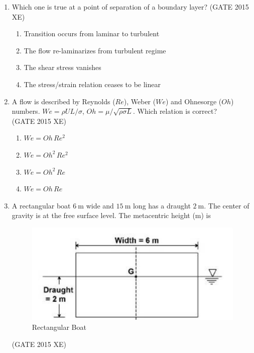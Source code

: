 \documentclass[journal,12pt,onecolumn]{IEEEtran}
\begin{document}
\begin{enumerate}
\item Which one is true at a point of separation of a boundary layer?  
\hfill{(GATE 2015 XE)} \\
\begin{multicols}{2}
\begin{enumerate}
\item Transition occurs from laminar to turbulent
\item The flow re-laminarizes from turbulent regime
\item The shear stress vanishes
\item The stress/strain relation ceases to be linear
\end{enumerate}
\end{multicols}

\newpage

\item A flow is described by Reynolds ($Re$), Weber ($We$) and Ohnesorge ($Oh$) numbers. $We = \rho U L / \sigma$, $Oh = \mu / \sqrt{\rho \sigma L}$. Which relation is correct?  \\
\hfill{(GATE 2015 XE)} 

\begin{multicols}{4}
\begin{enumerate}
\item $We = Oh \, Re^2$
\item $We = Oh^2 \, Re^2$
\item $We = Oh^2 \, Re$
\item $We = Oh \, Re$
\end{enumerate}
\end{multicols}

\item A rectangular boat $6\ \mathrm{m}$ wide and $15\ \mathrm{m}$ long has a draught $2\ \mathrm{m}$. The center of gravity is at the free surface level. The metacentric height (m) is  

\begin{figure}[htbp]
  \centering
  \includegraphics[width=.55\columnwidth]{figs/B/fig3.png} 
  \caption{Rectangular Boat}
  \label{fig:figs/B/fig3.png}
\end{figure}
\hfill{(GATE 2015 XE)} \\


\end{enumerate}
\end{document}
